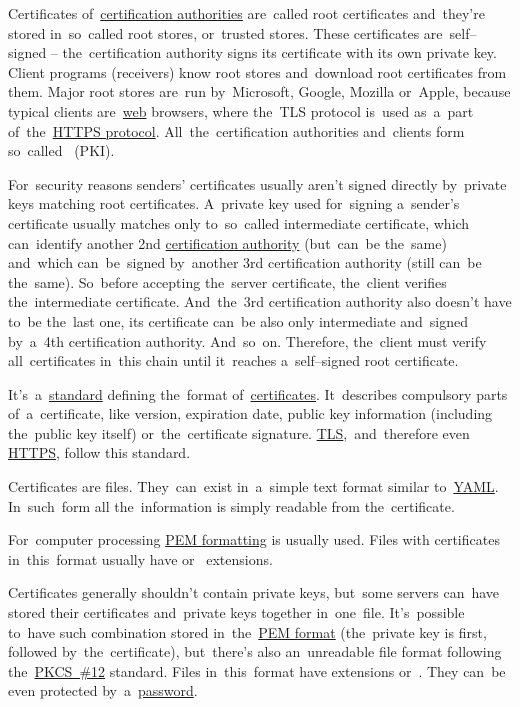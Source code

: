 Certificates of~\hyperref[certificationauthority]{certification authorities} are~called root certificates and~they're stored in~so~called root stores, or~trusted stores.
These certificates are~self--signed -- the~certification authority signs its certificate with its own private key.
Client programs (receivers) know root stores and~download root certificates from them.
Major root stores are~run by~Microsoft, Google, Mozilla or~Apple, because typical clients are~\hyperref[internetweb]{web} browsers, where the~TLS protocol is~used as~a~part of~the~\hyperref[https]{HTTPS protocol}.
All~the~certification authorities and~clients form so~called ~(PKI).

For~security reasons senders' certificates usually aren't signed directly by~private keys matching root certificates.
A~private key used for~signing a~sender's certificate usually matches only to~so~called intermediate certificate, which can~identify another 2nd \hyperref[certificationauthority]{certification authority} (but~can~be the~same) and~which can~be~signed by~another 3rd certification authority (still can~be the~same).
So~before accepting the~server certificate, the~client verifies the~intermediate certificate.
And~the~3rd certification authority also doesn't have to~be the~last one, its certificate can~be also only intermediate and~signed by~a~4th certification authority.
And~so~on.
Therefore, the~client must verify all~certificates in~this chain until it~reaches a~self--signed root certificate.

\label{x509}
It's~a~\hyperref[protocolstandard]{standard} defining the~format of~\hyperref[certificate]{certificates}.
It~describes compulsory parts of~a~certificate, like version, expiration date, public key information (including the~public key itself) or~the~certificate signature.
\hyperref[tls]{TLS},~and~therefore even \hyperref[https]{HTTPS}, follow this standard.

Certificates are files.
They~can~exist in~a~simple text format similar to~\hyperref[yaml]{YAML}.
In~such~form all the~information is simply readable from the~certificate.

For~computer processing \hyperref[pem]{PEM formatting} is usually used.
Files with certificates in~this~format usually have  or~ extensions.

Certificates generally shouldn't contain private keys, but~some servers can~have stored their certificates and~private keys together in~one~file.
It's~possible to~have such combination stored in~the~\hyperref[pem]{PEM format} (the~private key is first, followed by~the~certificate), but~there's also an~unreadable file format following the~\hyperref[pkcs]{PKCS~\#12} standard.
Files in~this~format have extensions  or~.
They can~be even protected by~a~\hyperref[keypassword]{password}.
\newpage
